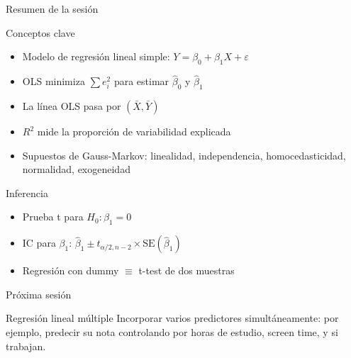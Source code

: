 \documentclass[aspectratio=169, 11pt]{beamer}
\begin{document}
\begin{frame}{Resumen de la sesi\'on}
\begin{block}{Conceptos clave}
\begin{itemize}
  \item Modelo de regresi\'on lineal simple: $Y = \beta_0 + \beta_1 X + \varepsilon$
  \item OLS minimiza $\sum e_i^2$ para estimar $\hat{\beta}_0$ y $\hat{\beta}_1$
  \item La l\'inea OLS pasa por $(\bar{X}, \bar{Y})$
  \item $R^2$ mide la proporci\'on de variabilidad explicada
  \item Supuestos de Gauss-Markov: linealidad, independencia, homocedasticidad, normalidad, exogeneidad
\end{itemize}
\end{block}

\begin{block}{Inferencia}
\begin{itemize}
  \item Prueba t para $H_0: \beta_1 = 0$
  \item IC para $\beta_1$: $\hat{\beta}_1 \pm t_{\alpha/2, n-2} \times \text{SE}(\hat{\beta}_1)$
  \item Regresi\'on con dummy $\equiv$ t-test de dos muestras
\end{itemize}
\end{block}
\end{frame}

\begin{frame}{Pr\'oxima sesi\'on}
\begin{exampleblock}{Regresi\'on lineal m\'ultiple}
Incorporar varios predictores simult\'aneamente: por ejemplo, predecir su nota controlando por horas de estudio, screen time, y si trabajan.
\end{exampleblock}
\end{frame}
\end{document}
